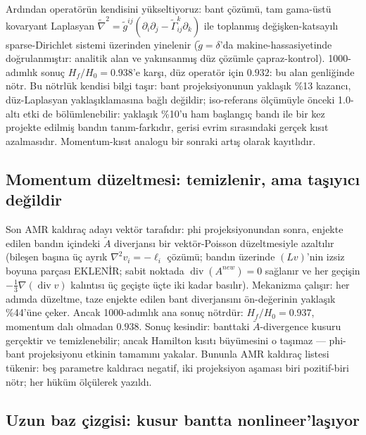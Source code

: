Ardından operatörün kendisini yükseltiyoruz: bant çözümü, tam
gama-üstü kovaryant Laplasyan
$\tilde\nabla^2 = \tilde g^{ij}(\partial_i\partial_j -
\tilde\Gamma^k_{ij}\partial_k)$ ile toplanmış
değişken-katsayılı sparse-Dirichlet sistemi üzerinden yinelenir
($\tilde g = \delta$'da makine-hassasiyetinde doğrulanmıştır:
analitik alan ve yakınsanmış düz çözümle çapraz-kontrol).
1000-adımlık sonuç $H_f/H_0 = 0.938$'e karşı, düz operatör için
$0.932$: bu alan genliğinde nötr. Bu nötrlük kendisi bilgi
taşır: bant projeksiyonunun yaklaşık \%13 kazancı, düz-Laplasyan
yaklaşıklamasına bağlı değildir; iso-referans ölçümüyle önceki
1.0-altı etki de bölümlenebilir: yaklaşık \%10'u ham başlangıç
bandı ile bir kez projekte edilmiş bandın tanım-farkıdır, gerisi
evrim sırasındaki gerçek kısıt azalmasıdır. Momentum-kısıt analogu
bir sonraki artış olarak kayıtlıdır.

\subsection{Momentum düzeltmesi: temizlenir, ama taşıyıcı değildir}

Son AMR kaldıraç adayı vektör tarafıdır: phi projeksiyonundan sonra,
enjekte edilen bandın içindeki $\tilde A$ diverjansı bir
vektör-Poisson düzeltmesiyle azaltılır (bileşen başına üç ayrık
$\nabla^2 v_i = -\ell_i$ çözümü; bandın üzerinde $(Lv)$'nin izsiz
boyuna parçası EKLENİR; sabit noktada
$\operatorname{div}(A^{new}) = 0$ sağlanır ve her geçişin
$-\tfrac13\nabla(\operatorname{div} v)$ kalıntısı üç geçişte üçte
iki kadar basılır). Mekanizma çalışır: her adımda düzeltme, taze
enjekte edilen bant diverjansını ön-değerinin yaklaşık \%44'üne
çeker. Ancak 1000-adımlık ana sonuç nötrdür: $H_f/H_0 = 0.937$,
momentum dalı olmadan $0.938$. Sonuç kesindir: banttaki
$\tilde A$-divergence kusuru gerçektir ve temizlenebilir; ancak
Hamilton kısıtı büyümesini o taşımaz — phi-bant projeksiyonu etkinin
tamamını yakalar. Bununla AMR kaldıraç listesi tükenir: beş
parametre kaldıracı negatif, iki projeksiyon aşaması biri
pozitif-biri nötr; her hüküm ölçülerek yazıldı.

\subsection{Uzun baz çizgisi: kusur bantta nonlineer'laşıyor}

